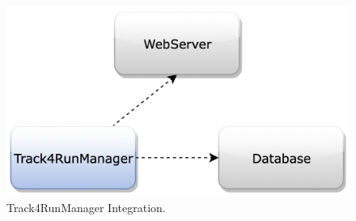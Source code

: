 \begin{figure}[H]
\centering
\includegraphics[scale=0.35]{Images/IntegrationPlanImages/fig4.png}
\caption{Track4RunManager Integration.}
\end{figure}

